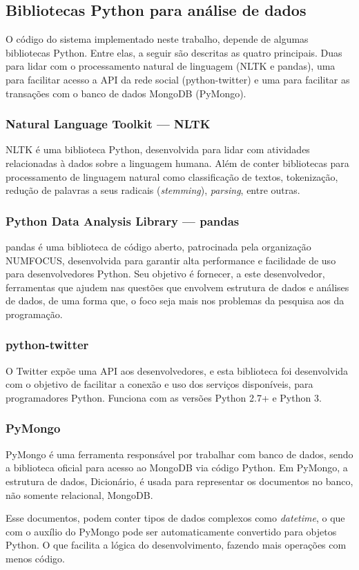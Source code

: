 \subsection{Bibliotecas Python para análise de dados}

O código do sistema implementado neste trabalho, depende de algumas bibliotecas Python. Entre elas, a seguir são descritas as quatro principais. Duas para lidar com o processamento natural de linguagem (NLTK e pandas), uma para facilitar acesso a API da rede social (python-twitter) e uma para facilitar as transações com o banco de dados MongoDB (PyMongo).

\subsubsection{Natural Language Toolkit — NLTK}

NLTK é uma biblioteca Python, desenvolvida para lidar com atividades relacionadas à dados sobre a linguagem humana. Além de conter bibliotecas para processamento de linguagem natural como classificação de textos, tokenização, redução de palavras a seus radicais (\textit{stemming}), \textit{parsing}, entre outras.

\subsubsection{Python Data Analysis Library — pandas}

pandas é uma biblioteca de código aberto, patrocinada pela organização NUMFOCUS, desenvolvida para garantir alta performance e facilidade de uso para desenvolvedores Python. Seu objetivo é fornecer, a este desenvolvedor, ferramentas que ajudem nas questões que envolvem estrutura de dados e análises de dados, de uma forma que, o foco seja mais nos problemas da pesquisa aos da programação.

\subsubsection{python-twitter}

O Twitter expõe uma API aos desenvolvedores, e esta biblioteca foi desenvolvida com o objetivo de facilitar a conexão e uso dos serviços disponíveis, para programadores Python. Funciona com as versões Python 2.7+ e Python 3.

\subsubsection{PyMongo}

PyMongo é uma ferramenta responsável por trabalhar com banco de dados, sendo a biblioteca oficial para acesso ao MongoDB via código Python. Em PyMongo, a estrutura de dados, Dicionário, é usada para representar os documentos no banco, não somente relacional, MongoDB. 

Esse documentos, podem conter tipos de dados complexos como \textit{datetime}, o que com o auxílio do PyMongo pode ser automaticamente convertido para objetos Python. O que facilita a lógica do desenvolvimento, fazendo mais operações com menos código.



